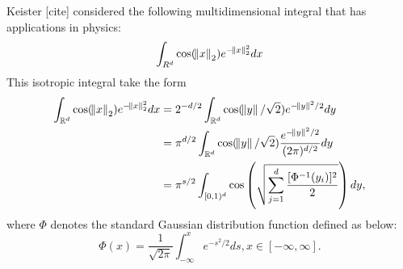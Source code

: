 \documentclass{iitthesis}
\begin{document}
Keister [cite] considered the following multidimensional integral that has applications in physics:
\begin{equation}\label{KeisterTestFun}
\int_{R^d} \cos (\norm{x}_2)e^{-\norm{x}_2^2} dx 
\end{equation}
This isotropic integral take the form
\begin{align}
 \int_{\mathbb{R}^d} \cos (\norm{x}_2)e^{-\norm{x}_2^2} dx &= 2^{-d/2}\int_{\mathbb{R}^d} \cos(\norm{y}/\sqrt{2}) e^{-\norm{y}^2/2} dy \\
&= \pi^{d/2} \int_{\mathbb{R}^d} \cos(\norm{y}/\sqrt{2}) \frac{e^{-\norm{y}^2/2}}{(2\pi)^{d/2}} dy\\
 &= \pi^{s/2} \int_{[0,1)^d} \cos \left ( \sqrt{\sum_{j=1}^d \frac{[\Phi^{-1}(y_i)]^2}{2}}\right )dy,
\end{align}
where $\Phi$ denotes the standard Gaussian distribution function defined as below:
$$\Phi(x) = \frac{1}{\sqrt{2\pi}} \int_{-\infty}^x e^{-s^2/2}ds, x \in [-\infty, \infty].$$
\end{document}
